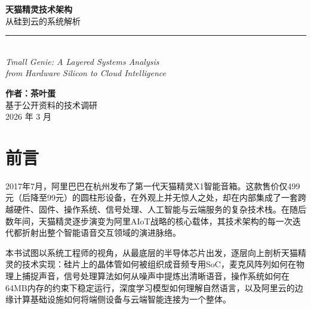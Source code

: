 \documentclass[12pt, a4paper, twoside, openright]{book}
\begin{document}
\begin{titlepage}
  \centering
  \vspace*{2cm}
  {\fontsize{36}{44}\selectfont\bfseries 天猫精灵技术架构}\\[0.8cm]
  {\fontsize{20}{28}\selectfont\color{gray} 从硅到云的系统解析}\\[0.4cm]
  \rule{\linewidth}{0.5mm}\\[0.6cm]
  {\large\itshape Tmall Genie: A Layered Systems Analysis\\
  from Hardware Silicon to Cloud Intelligence}\\[2cm]


  \vfill
  {\large\bfseries 作者：茶叶蛋}\\[0.4cm]
  {\large 基于公开资料的技术调研}\\[0.4cm]
  {\large\color{gray} 2026 年 3 月}
\end{titlepage}

\frontmatter
\chapter*{前言}

2017年7月，阿里巴巴在杭州发布了第一代天猫精灵X1智能音箱。这款售价仅499元（后降至99元）的圆柱形设备，在外观上并无惊人之处，却在内部集成了一套跨越硬件、固件、操作系统、信号处理、人工智能与云端服务的复杂技术栈。在随后数年间，天猫精灵逐步演变为阿里AIoT战略的核心载体，其技术架构的每一次迭代都折射出整个智能语音交互领域的演进脉络。

本书试图以系统工程师的视角，从最底层的半导体芯片出发，逐层向上剖析天猫精灵的技术实现：硅片上的晶体管如何被组织成音频专用SoC，麦克风阵列如何在物理上捕捉声音，信号处理算法如何从噪声中提炼出清晰语音，操作系统如何在64MB内存的约束下稳定运行，深度学习模型如何理解自然语言，以及阿里云的边缘计算基础设施如何将端侧设备与云端智能连接为一个整体。
\end{document}
